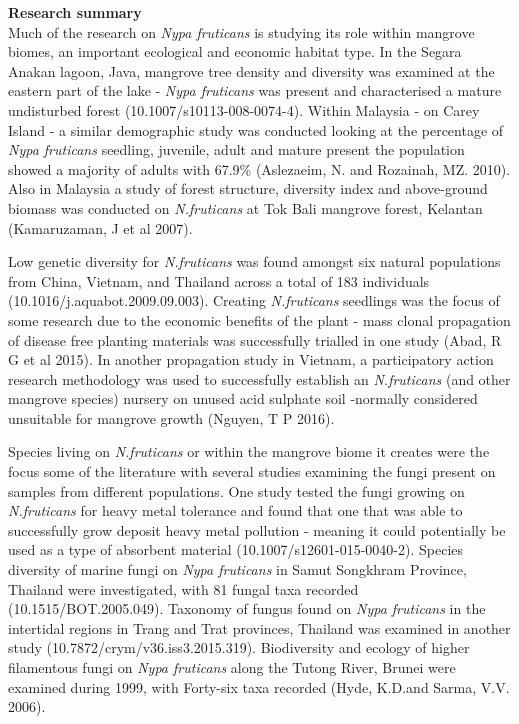 \documentclass[]{book}
\theoremstyle{definition}
\theoremstyle{definition}
\theoremstyle{definition}
\theoremstyle{remark}
\begin{document}
\textbf{Research summary}\\
Much of the research on \emph{Nypa fruticans} is studying its role
within mangrove biomes, an important ecological and economic habitat
type. In the Segara Anakan lagoon, Java, mangrove tree density and
diversity was examined at the eastern part of the lake - \emph{Nypa
fruticans} was present and characterised a mature undisturbed forest
(10.1007/s10113-008-0074-4). Within Malaysia - on Carey Island - a
similar demographic study was conducted looking at the percentage of
\emph{Nypa fruticans} seedling, juvenile, adult and mature present the
population showed a majority of adults with 67.9\% (Aslezaeim, N. and
Rozainah, MZ. 2010). Also in Malaysia a study of forest structure,
diversity index and above-ground biomass was conducted on
\emph{N.fruticans} at Tok Bali mangrove forest, Kelantan (Kamaruzaman, J
et al 2007).

Low genetic diversity for \emph{N.fruticans} was found amongst six
natural populations from China, Vietnam, and Thailand across a total of
183 individuals (10.1016/j.aquabot.2009.09.003). Creating
\emph{N.fruticans} seedlings was the focus of some research due to the
economic benefits of the plant - mass clonal propagation of disease free
planting materials was successfully trialled in one study (Abad, R G et
al 2015). In another propagation study in Vietnam, a participatory
action research methodology was used to successfully establish an
\emph{N.fruticans} (and other mangrove species) nursery on unused acid
sulphate soil -normally considered unsuitable for mangrove growth
(Nguyen, T P 2016).

Species living on \emph{N.fruticans} or within the mangrove biome it
creates were the focus some of the literature with several studies
examining the fungi present on samples from different populations. One
study tested the fungi growing on \emph{N.fruticans} for heavy metal
tolerance and found that one that was able to successfully grow deposit
heavy metal pollution - meaning it could potentially be used as a type
of absorbent material (10.1007/s12601-015-0040-2). Species diversity of
marine fungi on \emph{Nypa fruticans} in Samut Songkhram Province,
Thailand were investigated, with 81 fungal taxa recorded
(10.1515/BOT.2005.049). Taxonomy of fungus found on \emph{Nypa
fruticans} in the intertidal regions in Trang and Trat provinces,
Thailand was examined in another study (10.7872/crym/v36.iss3.2015.319).
Biodiversity and ecology of higher filamentous fungi on \emph{Nypa
fruticans} along the Tutong River, Brunei were examined during 1999,
with Forty-six taxa recorded (Hyde, K.D.and Sarma, V.V. 2006).
\end{document}
